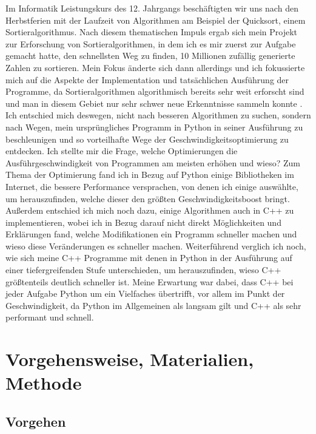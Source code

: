 \documentclass[11pt,a4paper]{article}
\begin{document}
Im Informatik Leistungskurs des 12. Jahrgangs beschäftigten wir uns nach den Herbstferien mit
der Laufzeit von Algorithmen am Beispiel der Quicksort, einem Sortieralgorithmus.
Nach diesem thematischen Impuls ergab sich mein Projekt zur Erforschung von Sortieralgorithmen,
in dem ich es mir zuerst zur Aufgabe gemacht hatte, den schnellsten Weg zu finden, 10 Millionen zufällig
generierte Zahlen zu sortieren. Mein Fokus änderte sich dann allerdings und ich fokussierte mich
auf die Aspekte der Implementation und tatsächlichen Ausführung der Programme, da 
Sortieralgorithmen algorithmisch bereits sehr weit erforscht sind und man in diesem Gebiet nur
sehr schwer neue Erkenntnisse sammeln konnte \cite{sortieralgorithmenwikipedia}.
Ich entschied mich deswegen, nicht nach besseren Algorithmen zu suchen, sondern nach Wegen, 
mein ursprüngliches Programm in Python in seiner Ausführung zu beschleunigen und so vorteilhafte
Wege der Geschwindigkeitsoptimierung zu entdecken.
Ich stellte mir die Frage, welche Optimierungen die Ausführgeschwindigkeit von Programmen
am meisten erhöhen und wieso?
Zum Thema der Optimierung fand ich in Bezug auf Python einige Bibliotheken im Internet, die
bessere Performance versprachen, von denen ich einige auswählte, um herauszufinden,
welche dieser den größten Geschwindigkeitsboost bringt.
Außerdem entschied ich mich noch dazu, einige Algorithmen auch in C++ zu implementieren, wobei ich in Bezug
darauf nicht direkt Möglichkeiten und Erklärungen fand, welche Modifikationen ein Programm schneller machen und
wieso diese Veränderungen es schneller machen.
Weiterführend verglich ich noch, wie sich meine C++ Programme mit denen in Python in der Ausführung auf einer
tiefergreifenden Stufe unterschieden, um herauszufinden, wieso C++ größtenteils deutlich schneller ist.
Meine Erwartung war dabei, dass C++ bei jeder Aufgabe Python um ein Vielfaches übertrifft, vor allem im Punkt der Geschwindigkeit,
da Python im Allgemeinen als langsam gilt und C++ als sehr performant und schnell.

\clearpage

\section{Vorgehensweise, Materialien, Methode}

\subsection{Vorgehen}
\end{document}
